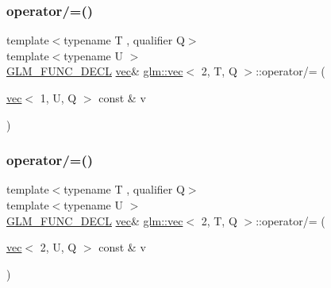 \mbox{\label{structglm_1_1vec_3_012_00_01_t_00_01_q_01_4_ac08ebb38eeef819015ce62bf46fd1a8f}} 
\subsubsection{\texorpdfstring{operator/=()}{operator/=()}\hspace{0.1cm}{\footnotesize\ttfamily [2/6]}}
{\footnotesize\ttfamily template$<$typename T , qualifier Q$>$ \\
template$<$typename U $>$ \\
\hyperlink{setup_8hpp_ab2d052de21a70539923e9bcbf6e83a51}{G\+L\+M\+\_\+\+F\+U\+N\+C\+\_\+\+D\+E\+CL} \hyperlink{structglm_1_1vec}{vec}\& \hyperlink{structglm_1_1vec}{glm\+::vec}$<$ 2, T, Q $>$\+::operator/= (\begin{DoxyParamCaption}\item[{\hyperlink{structglm_1_1vec}{vec}$<$ 1, U, Q $>$ const \&}]{v }\end{DoxyParamCaption})}

\mbox{\label{structglm_1_1vec_3_012_00_01_t_00_01_q_01_4_a5c779bb132a97e91d6d8180a9c3fe31d}} 
\subsubsection{\texorpdfstring{operator/=()}{operator/=()}\hspace{0.1cm}{\footnotesize\ttfamily [3/6]}}
{\footnotesize\ttfamily template$<$typename T , qualifier Q$>$ \\
template$<$typename U $>$ \\
\hyperlink{setup_8hpp_ab2d052de21a70539923e9bcbf6e83a51}{G\+L\+M\+\_\+\+F\+U\+N\+C\+\_\+\+D\+E\+CL} \hyperlink{structglm_1_1vec}{vec}\& \hyperlink{structglm_1_1vec}{glm\+::vec}$<$ 2, T, Q $>$\+::operator/= (\begin{DoxyParamCaption}\item[{\hyperlink{structglm_1_1vec}{vec}$<$ 2, U, Q $>$ const \&}]{v }\end{DoxyParamCaption})}

